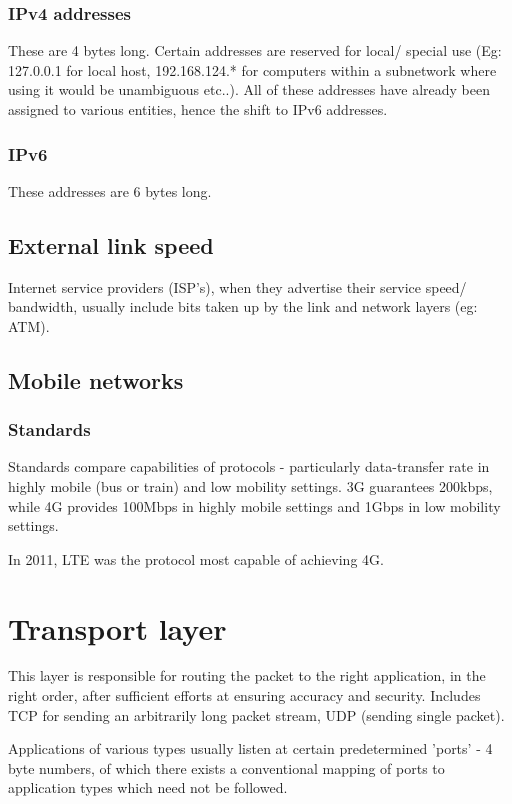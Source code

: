 \documentclass[oneside, article]{memoir}
\begin{document}
\subsubsection{IPv4 addresses}
These are 4 bytes long. Certain addresses are reserved for local/ special use (Eg: 127.0.0.1 for local host, 192.168.124.* for computers within a subnetwork where using it would be unambiguous etc..). All of these addresses have already been assigned to various entities, hence the shift to IPv6 addresses.

\subsubsection{IPv6}
These addresses are 6 bytes long.

\subsection{External link speed}
Internet service providers (ISP's), when they advertise their service speed/ bandwidth, usually include bits taken up by the link and network layers (eg: ATM).

\subsection{Mobile networks}
\subsubsection{Standards}
Standards compare capabilities of protocols - particularly data-transfer rate in highly mobile (bus or train) and low mobility settings. 3G guarantees 200kbps, while 4G provides 100Mbps in highly mobile settings and 1Gbps in low mobility settings.

In 2011, LTE was the protocol most capable of achieving 4G.

\section{Transport layer}
This layer is responsible for routing the packet to the right application, in the right order, after sufficient efforts at ensuring accuracy and security. Includes TCP for sending an arbitrarily long packet stream, UDP (sending single packet).

Applications of various types usually listen at certain predetermined 'ports' - 4 byte numbers, of which there exists a conventional mapping of ports to application types which need not be followed.
\end{document}
